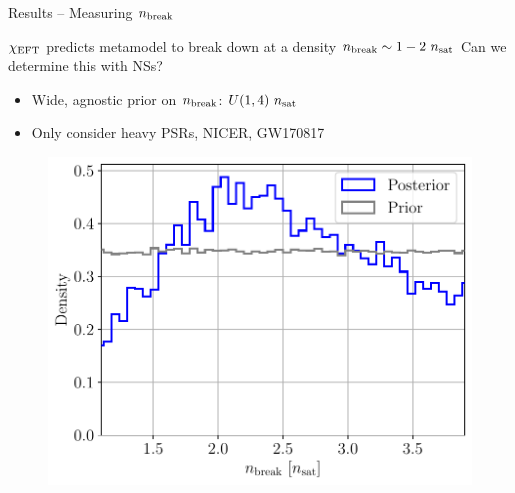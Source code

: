 \documentclass[usenames,dvipsnames,t]{beamer}
\begin{document}
\begin{frame}{Results -- Measuring $n_{\rm{break}}$}

  \def\x{2mm}
  \def\y{2mm}

  $\chi_{\rm{EFT}}$ predicts metamodel to break down at a density $n_{\rm{break}} \sim 1-2 \ n_{\rm{sat}}$ 
  Can we determine this with NSs?

  \begin{itemize}
    \vspace{\y}
    \item Wide, agnostic prior on $n_{\rm{break}}$: $U(1, 4) \ n_{\rm{sat}}$

    \vspace{\y}
    \item Only consider heavy PSRs, NICER, GW170817

  \end{itemize}

  \vspace{\x}

  \begin{figure}
    \centering
    \includegraphics[width=0.55\linewidth]{Figures/nbreak_posterior.pdf}
  \end{figure}

\end{frame}
\end{document}
